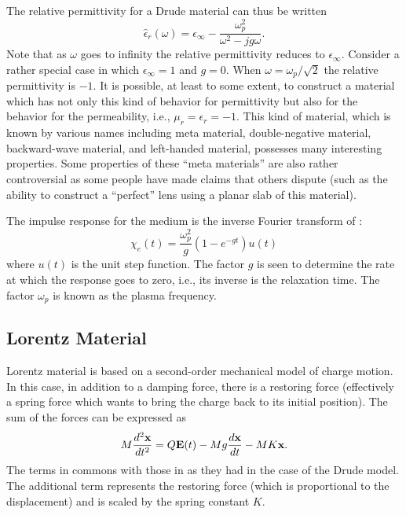 The relative permittivity for a Drude material can thus be written
\begin{equation}
  \hat{\epsilon}_r(\omega) = \epsilon_\infty 
    - \frac{\omega^2_p}{\omega^2 - jg\omega}
  \label{eq:drudeEpsR}.
\end{equation}
Note that as $\omega$ goes to infinity the relative permittivity
reduces to $\epsilon_\infty$.  Consider a rather special case in which
$\epsilon_\infty=1$ and $g=0$.  When $\omega=\omega_p/\sqrt{2}$ the
relative permittivity is $-1$.  It is possible, at least to some
extent, to construct a material which has not only this kind of
behavior for permittivity but also for the behavior for the
permeability, i.e., $\mu_r=\epsilon_r=-1$.  This kind of material,
which is known by various names including meta material,
double-negative material, backward-wave material, and left-handed
material, possesses many interesting properties.  Some properties of
these ``meta materials'' are also rather controversial as some people
have made claims that others dispute (such as the ability to construct
a ``perfect'' lens using a planar slab of this material).

The impulse response for the medium is the inverse Fourier transform of 
:
\begin{equation}
  \chi_e(t) = \frac{\omega^2_p}{g}\left(1-e^{-gt}\right)u(t)
\end{equation}
where $u(t)$ is the unit step function.  The factor $g$ is seen to
determine the rate at which the response goes to zero, i.e., its
inverse is the relaxation time.  The factor $\omega_p$ is known as the
plasma frequency.

\subsection{Lorentz Material}

Lorentz material is based on a second-order mechanical model of charge
motion.  In this case, in addition to a damping force, there is a
restoring force (effectively a spring force which wants to bring the
charge back to its initial position).  The sum of the forces can be
expressed as
\begin{equation}
  M\frac{d^2\mathbf{x}}{dt^2} = 
  Q\mathbf{E}(t) - Mg \frac{d\mathbf{x}}{dt} - MK \mathbf{x}.
  \label{eq:lorentzPhysical}
\end{equation}
The terms in commons with those in  as they
had in the case of the Drude model.  The additional term represents
the restoring force (which is proportional to the displacement) and is
scaled by the spring constant $K$.

